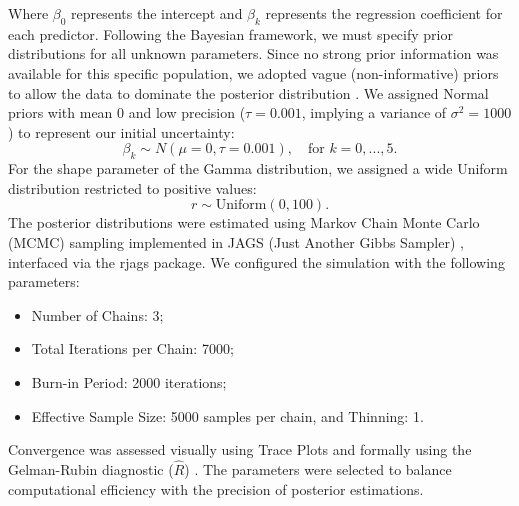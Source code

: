 Where $\beta_0$ represents the intercept and $\beta_k$ represents the regression coefficient for each predictor. Following the Bayesian framework, we must specify prior distributions for all unknown parameters. Since no strong prior information was available for this specific population, we adopted vague (non-informative) priors to allow the data to dominate the posterior distribution \cite{gelman2013}. We assigned Normal priors with mean 0 and low precision ($\tau=0.001$, implying a variance of $\sigma^2 = 1000$) to represent our initial uncertainty: 
$$\beta_k \sim N(\mu=0, \tau=0.001), \quad \text{for } k = 0, ..., 5.$$ 
For the shape parameter of the Gamma distribution, we assigned a wide Uniform distribution restricted to positive values: 
$$r \sim \text{Uniform}(0, 100).$$ The posterior distributions were estimated using Markov Chain Monte Carlo (MCMC) sampling implemented in JAGS (Just Another Gibbs Sampler) \cite{plummer200}, interfaced via the rjags package. We configured the simulation with the following parameters:
\begin{itemize}
	\item Number of Chains: 3;
	\item Total Iterations per Chain: 7000;
	\item Burn-in Period: 2000 iterations;
	\item Effective Sample Size: 5000 samples per chain, and Thinning: 1.  
\end{itemize}
Convergence was assessed visually using Trace Plots and formally using the Gelman-Rubin diagnostic ($\hat{R}$) \cite{silva2023notes}. The parameters were selected to balance computational efficiency with the precision of posterior estimations.